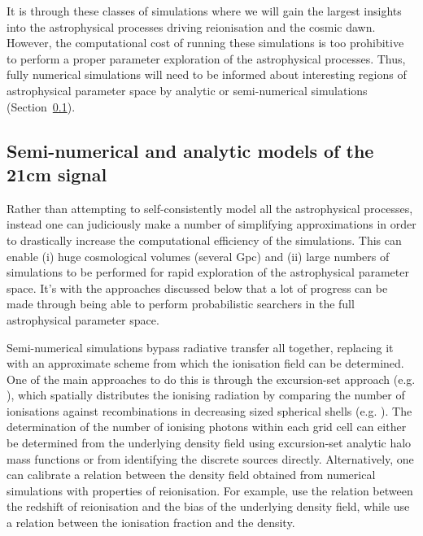 It is through these classes of simulations where we will gain the largest insights into the astrophysical processes driving reionisation and the cosmic dawn. However, the computational cost of running these simulations is too prohibitive to perform a proper parameter exploration of the astrophysical processes. Thus, fully numerical simulations will need to be informed about interesting regions of astrophysical parameter space by analytic or semi-numerical simulations (Section~\ref{sec:efficientsims}).

\subsection{Semi-numerical and analytic models of the 21cm signal} \label{sec:efficientsims}

Rather than attempting to self-consistently model all the astrophysical processes, instead one can judiciously make a number of simplifying approximations in order to drastically increase the computational efficiency of the simulations. This can enable (i) huge cosmological volumes (several Gpc) and (ii) large numbers of simulations to be performed for rapid exploration of the astrophysical parameter space. It's with the approaches discussed below that a lot of progress can be made through being able to perform probabilistic searchers in the full astrophysical parameter space.

Semi-numerical simulations bypass radiative transfer all together, replacing it with an approximate scheme from which the ionisation field can be determined. One of the main approaches to do this is through the excursion-set approach (e.g. \cite{Furlanetto:2004}), which spatially distributes the ionising radiation by comparing the number of ionisations against recombinations in decreasing sized spherical shells (e.g. \cite{Mesinger:2007,Zahn:2007,Geil:2008,Alvarez:2009,Santos:2010,Mesinger:2011,Visbal:2012,Kim:2013,Fialkov:2014,Majumdar:2014,Choudhury:2015,Hassan:2016,Kulkarni:2016,Mutch:2016,Hutter:2018b,Park:2019}). The determination of the number of ionising photons within each grid cell can either be determined from the underlying density field using excursion-set analytic halo mass functions or from identifying the discrete sources directly. Alternatively, one can calibrate a relation between the density field obtained from numerical simulations with properties of reionisation. For example, \cite{Battaglia:2013} use the relation between the redshift of reionisation and the bias of the underlying density field, while \cite{Kim:2016} use a relation between the ionisation fraction and the density.

